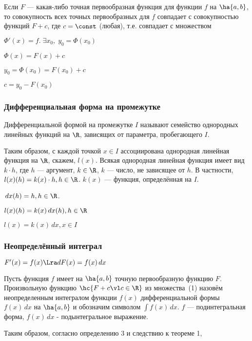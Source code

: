 \documentclass[a4paper]{article}
\begin{document}
\begin{imp}
Если $F$ --- какая-либо точная первообразная функция для функции $f$
на $\ha{a,b}$, то совокупность всех точных первообразных для $f$
совпадает с совокупностью функций $F + c$, где $c=\const$ (любая),
т.е. совпадает с множеством 
\end{imp}

$\Phi'(x)=f. \;\exists x_0, \;y_0=\Phi(x_0)$

$\Phi(x)=F(x) + c$

$y_0=\Phi(x_0)=F(x_0) + c$

$c=y_0-F(x_0)$

\subsubsection{Дифференциальная форма на промежутке}
\begin{df*}
Дифференциальной формой на промежутке $I$ называют семейство
однородных линейных функций на $\R$, зависящих от параметра,
пробегающего $I$.
\end{df*}
Таким образом, с каждой точкой $x\in I$ ассоциирована однородная
линейная функция на $\R$, скажем, $l(x)$. Всякая однородная
линейная функция имеет вид $k \cdot h$, где $h$ --- аргумент, $k \in
\R$, $k$ --- число, не зависящее от $h$. В частности,
$l(x)(h)=k(x)\cdot h, h \in \R$. $k(x)$ --- функция,
определённая на $I$.

$\,dx(h)=h, h \in \R$.

$l(x)(h)=k(x)\,dx(h), h \in \R$

$l(x)=k(x)\,dx, x \in I$

\subsubsection{Неопределённый интеграл}

$F'(x)=f(x) \Lra dF(x)=f(x)\,dx$

\begin{df*}
  Пусть функция $f$ имеет на $\ha{a,b}$ точную первообразную функцию $F$.
Произвольную функцию $\hc{F + c \vl c \in \R}$ из множества~(1) назовём неопределенным интегралом функции $f(x)$
дифференциальной формы $f(x)\,dx$ на $\ha{a,b}$ и обозначим символом
$\int f(x)\,dx$. $f$ --- подинтегральная форма, $f(x)\,dx$ -
подынтегральное выражение.
\end{df*}

Таким образом, согласно определению 3 и следствию к теореме 1,
\end{document}
